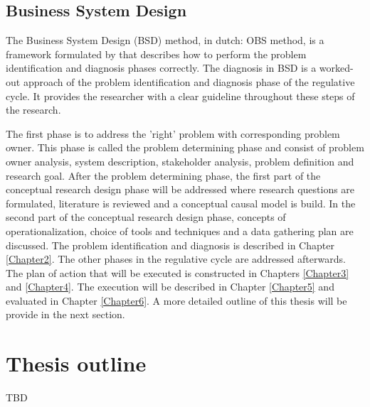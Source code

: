 \subsection{Business System Design} \label{BSD}
The Business System Design (BSD) method, in dutch: OBS method, is a framework formulated by \citet{Prins2008} that describes how to perform the problem identification and diagnosis phases correctly. The diagnosis in BSD is a worked-out approach of the problem identification and diagnosis phase of the regulative cycle. It provides the researcher with a clear guideline throughout these steps of the research. 

The first phase is to address the 'right' problem with corresponding problem owner. This phase is called the problem determining phase and consist of problem owner analysis, system description, stakeholder analysis, problem definition and research goal. After the problem determining phase, the first part of the conceptual research design phase will be addressed where research questions are formulated, literature is reviewed and a conceptual causal model is build. In the second part of the conceptual research design phase, concepts of operationalization, choice of tools and techniques and a data gathering plan are discussed. The problem identification and diagnosis is described in Chapter \ref{Chapter2}. The other phases in the regulative cycle are addressed afterwards. The plan of action that will be executed is constructed in Chapters \ref{Chapter3} and \ref{Chapter4}. The execution will be described in Chapter \ref{Chapter5} and evaluated in Chapter \ref{Chapter6}. A more detailed outline of this thesis will be provide in the next section.

\section{Thesis outline} \label{Thesis outline}
TBD